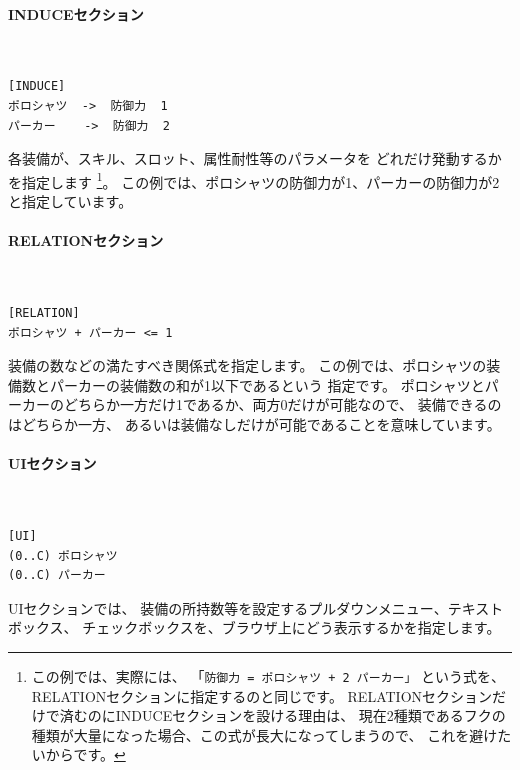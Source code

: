 \documentclass[dvipdfmx]{jsarticle}
\begin{document}
\paragraph{INDUCEセクション}~\medskip
{\footnotesize\begin{mdframed}\begin{Verbatim}
[INDUCE]
ポロシャツ  ->  防御力  1
パーカー    ->  防御力  2
\end{Verbatim}
\end{mdframed}}
\medskip

各装備が、スキル、スロット、属性耐性等のパラメータを
どれだけ発動するかを指定します%
\footnote{
この例では、実際には、
「\texttt{防御力 = ポロシャツ + 2 パーカー」}
という式を、RELATIONセクションに指定するのと同じです。
RELATIONセクションだけで済むのにINDUCEセクションを設ける理由は、
現在2種類であるフクの種類が大量になった場合、この式が長大になってしまうので、
これを避けたいからです。
}。
この例では、ポロシャツの防御力が1、パーカーの防御力が2と指定しています。

\paragraph{RELATIONセクション}~\medskip
{\footnotesize\begin{mdframed}\begin{Verbatim}
[RELATION]
ポロシャツ + パーカー <= 1
\end{Verbatim}
\end{mdframed}}
\medskip

装備の数などの満たすべき関係式を指定します。
この例では、ポロシャツの装備数とパーカーの装備数の和が1以下であるという
指定です。
ポロシャツとパーカーのどちらか一方だけ1であるか、両方0だけが可能なので、
装備できるのはどちらか一方、
あるいは装備なしだけが可能であることを意味しています。

\paragraph{UIセクション}~\medskip
{\footnotesize\begin{mdframed}\begin{Verbatim}
[UI]
(0..C) ポロシャツ
(0..C) パーカー
\end{Verbatim}
\end{mdframed}}
\medskip

UIセクションでは、
装備の所持数等を設定するプルダウンメニュー、テキストボックス、
チェックボックスを、ブラウザ上にどう表示するかを指定します。
\end{document}
